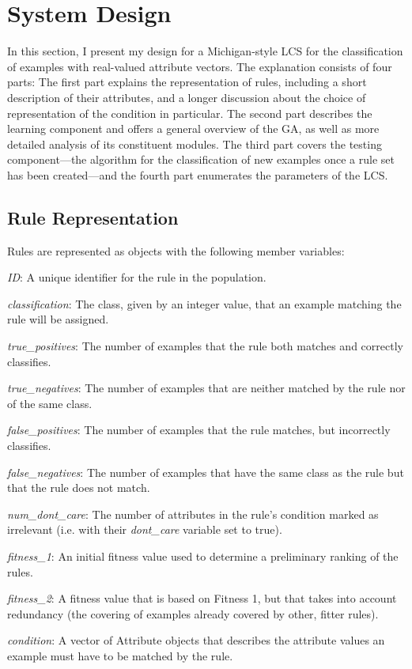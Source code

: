 \documentclass[12pt,twoside]{article}
\begin{document}
\section{System Design}

In this section, I present my design for a Michigan-style LCS for the classification of examples with real-valued attribute vectors. The explanation consists of four parts: The first part explains the representation of rules, including a short description of their attributes, and a longer discussion about the choice of representation of the condition in particular. The second part describes the learning component and offers a general overview of the GA, as well as more detailed analysis of its constituent modules. The third part covers the testing component---the algorithm for the classification of new examples once a rule set has been created---and the fourth part enumerates the parameters of the LCS.

\subsection{Rule Representation}

Rules are represented as objects with the following member variables:

\begin{description}
\item \textit{ID}: A unique identifier for the rule in the population.
\item \textit{classification}: The class, given by an integer value, that an example matching the rule will be assigned.
\item \textit{true\_positives}: The number of examples that the rule both matches and correctly classifies.
\item \textit{true\_negatives}: The number of examples that are neither matched by the rule nor of the same class.
\item \textit{false\_positives}: The number of examples that the rule matches, but incorrectly classifies.
\item \textit{false\_negatives}: The number of examples that have the same class as the rule but that the rule does not match.
\item \textit{num\_dont\_care}: The number of attributes in the rule's condition marked as irrelevant (i.e. with their \textit{dont\_care} variable set to true).
\item \textit{fitness\_1}: An initial fitness value used to determine a preliminary ranking of the rules.
\item \textit{fitness\_2}: A fitness value that is based on Fitness 1, but that takes into account redundancy (the covering of examples already covered by other, fitter rules).
\item \textit{condition}: A vector of Attribute objects that describes the attribute values an example must have to be matched by the rule.
\end{description}
\end{document}
